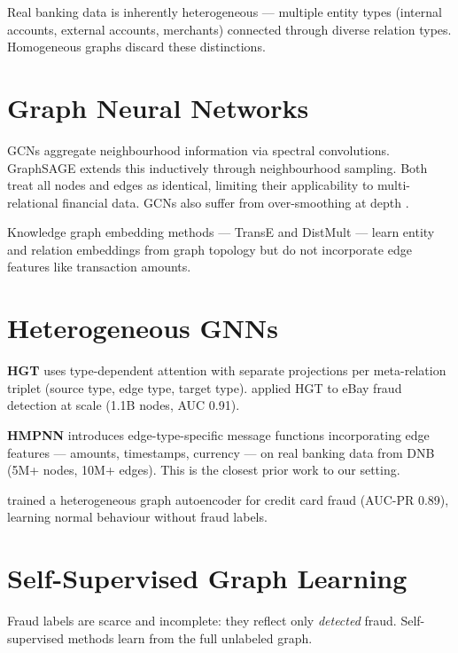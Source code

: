 Real banking data is inherently heterogeneous --- multiple entity types (internal accounts, external accounts, merchants) connected through diverse relation types. Homogeneous graphs discard these distinctions.

\section{Graph Neural Networks}
\label{sec:gnns}

GCNs \citep{kipf2017gcn} aggregate neighbourhood information via spectral convolutions. GraphSAGE \citep{hamilton2017sage} extends this inductively through neighbourhood sampling. Both treat all nodes and edges as identical, limiting their applicability to multi-relational financial data. GCNs also suffer from over-smoothing at depth \citep{cheng2024survey}.

Knowledge graph embedding methods --- TransE \citep{bordes2013transe} and DistMult \citep{yang2015distmult} --- learn entity and relation embeddings from graph topology but do not incorporate edge features like transaction amounts.

\section{Heterogeneous GNNs}
\label{sec:hetero-gnns}

\textbf{HGT} \citep{hu2020hgt} uses type-dependent attention with separate projections per meta-relation triplet (source type, edge type, target type). \citet{rao2022xfraud} applied HGT to eBay fraud detection at scale (1.1B nodes, AUC 0.91).

\textbf{HMPNN} \citep{johannessen2023hmpnn} introduces edge-type-specific message functions incorporating edge features --- amounts, timestamps, currency --- on real banking data from DNB (5M+ nodes, 10M+ edges). This is the closest prior work to our setting.

\citet{singh2024hetero} trained a heterogeneous graph autoencoder for credit card fraud (AUC-PR 0.89), learning normal behaviour without fraud labels.

\section{Self-Supervised Graph Learning}
\label{sec:self-supervised}

Fraud labels are scarce and incomplete: they reflect only \textit{detected} fraud. Self-supervised methods learn from the full unlabeled graph.

